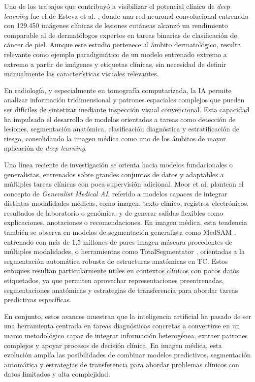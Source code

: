 Uno de los trabajos que contribuyó a visibilizar el potencial clínico de \textit{deep learning} fue el de Esteva et al. \cite{Esteva2017}, donde una red neuronal convolucional entrenada con 129.450 imágenes clínicas de lesiones cutáneas alcanzó un rendimiento comparable al de dermatólogos expertos en tareas binarias de clasificación de cáncer de piel. Aunque este estudio pertenece al ámbito dermatológico, resulta relevante como ejemplo paradigmático de un modelo entrenado extremo a extremo a partir de imágenes y etiquetas clínicas, sin necesidad de definir manualmente las características visuales relevantes.

En radiología, y especialmente en tomografía computarizada, la IA permite analizar información tridimensional y patrones espaciales complejos que pueden ser difíciles de sintetizar mediante inspección visual convencional. Esta capacidad ha impulsado el desarrollo de modelos orientados a tareas como detección de lesiones, segmentación anatómica, clasificación diagnóstica y estratificación de riesgo, consolidando la imagen médica como uno de los ámbitos de mayor aplicación de \textit{deep learning}.

Una línea reciente de investigación se orienta hacia modelos fundacionales o generalistas, entrenados sobre grandes conjuntos de datos y adaptables a múltiples tareas clínicas con poca supervisión adicional. Moor et al. \cite{Moor2023} plantean el concepto de \textit{Generalist Medical AI}, referido a modelos capaces de integrar distintas modalidades médicas, como imagen, texto clínico, registros electrónicos, resultados de laboratorio o genómica, y de generar salidas flexibles como explicaciones, anotaciones o recomendaciones. En imagen médica, esta tendencia también se observa en modelos de segmentación generalista como MedSAM \cite{Ma2023}, entrenado con más de 1,5 millones de pares imagen-máscara procedentes de múltiples modalidades, o herramientas como TotalSegmentator \cite{wasserthal2023totalsegmentator}, orientadas a la segmentación automática robusta de estructuras anatómicas en TC. Estos enfoques resultan particularmente útiles en contextos clínicos con pocos datos etiquetados, ya que permiten aprovechar representaciones preentrenadas, segmentaciones anatómicas y estrategias de transferencia para abordar tareas predictivas específicas.

En conjunto, estos avances muestran que la inteligencia artificial ha pasado de ser una herramienta centrada en tareas diagnósticas concretas a convertirse en un marco metodológico capaz de integrar información heterogénea, extraer patrones complejos y apoyar procesos de decisión clínica. En imagen médica, esta evolución amplía las posibilidades de combinar modelos predictivos, segmentación automática y estrategias de transferencia para abordar problemas clínicos con datos limitados y alta complejidad.

